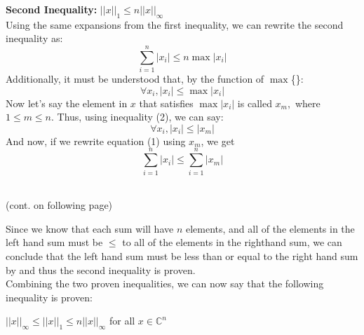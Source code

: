 \documentclass{article}
\begin{document}
\subsubsection*{}
\textbf{Second Inequality: }$||x||_1\leq n||x||_\infty$\\

Using the same expansions from the first inequality, we can rewrite the second inequality as:
\begin{equation}
    \sum_{i=1}^n|x_i|\leq n\max|x_i|
\end{equation}
Additionally, it must be understood that, by the function of $\max$\{\}:
\begin{equation}
   \forall x_i, |x_i|\leq \max|x_i|
\end{equation}
Now let's say the element in $x$ that satisfies $\max|x_i|$ is called $x_m,$ where $1\leq m\leq n$.  Thus, using inequality (2), we can say: 
\begin{equation}
    \forall x_i, |x_i|\leq|x_m|  
\end{equation}
And now, if we rewrite equation (1) using $x_m$, we get
\begin{equation}
    \sum_{i=1}^n|x_i|\leq\sum_{i=1}^n|x_m|
\end{equation}
\\
\centerline{(cont. on following page)}
\pagebreak

Since we know that each sum will have $n$ elements, and all of the elements in the left hand sum must be $\leq$ to all of the elements in the righthand sum, we can conclude that the left hand sum must be less than or equal to the right hand sum by and thus the second inequality is proven.\\

Combining the two proven inequalities, we can now say that the following inequality is proven:\\
\centerline{$||x||_\infty\leq||x||_1\leq n||x||_\infty$ for all $x \in \mathbb{C}^n$}
\end{document}

